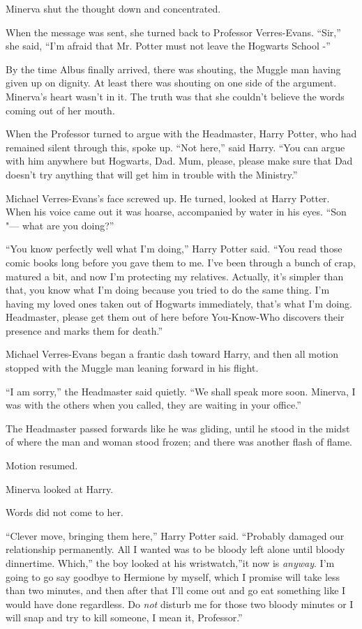 Minerva shut the thought down and concentrated.

When the message was sent, she turned back to Professor Verres-Evans.
``Sir,'' she said, ``I'm afraid that Mr. Potter must not leave the
Hogwarts School -''

By the time Albus finally arrived, there was shouting, the Muggle man
having given up on dignity. At least there was shouting on one side of
the argument. Minerva's heart wasn't in it. The truth was that she
couldn't believe the words coming out of her mouth.

When the Professor turned to argue with the Headmaster, Harry Potter,
who had remained silent through this, spoke up. ``Not here,'' said
Harry. ``You can argue with him anywhere but Hogwarts, Dad. Mum, please,
please make sure that Dad doesn't try anything that will get him in
trouble with the Ministry.''

Michael Verres-Evans's face screwed up. He turned, looked at Harry
Potter. When his voice came out it was hoarse, accompanied by water in
his eyes. ``Son "--- what are you doing?''

``You know perfectly well what I'm doing,'' Harry Potter said. ``You
read those comic books long before you gave them to me. I've been
through a bunch of crap, matured a bit, and now I'm protecting my
relatives. Actually, it's simpler than that, you know what I'm doing
because you tried to do the same thing. I'm having my loved ones taken
out of Hogwarts immediately, that's what I'm doing. Headmaster, please
get them out of here before You-Know-Who discovers their presence and
marks them for death.''

Michael Verres-Evans began a frantic dash toward Harry, and then all
motion stopped with the Muggle man leaning forward in his flight.

``I am sorry,'' the Headmaster said quietly. ``We shall speak more soon.
Minerva, I was with the others when you called, they are waiting in your
office.''

The Headmaster passed forwards like he was gliding, until he stood in
the midst of where the man and woman stood frozen; and there was another
flash of flame.

Motion resumed.

Minerva looked at Harry.

Words did not come to her.

``Clever move, bringing them here,'' Harry Potter said. ``Probably
damaged our relationship permanently. All I wanted was to be bloody left
alone until bloody dinnertime. Which,'' the boy looked at his
wristwatch,''it now is \emph{anyway}. I'm going to go say goodbye to
Hermione by myself, which I promise will take less than two minutes, and
then after that I'll come out and go eat something like I would have
done regardless. Do \emph{not} disturb me for those two bloody minutes
or I will snap and try to kill someone, I mean it, Professor.''

